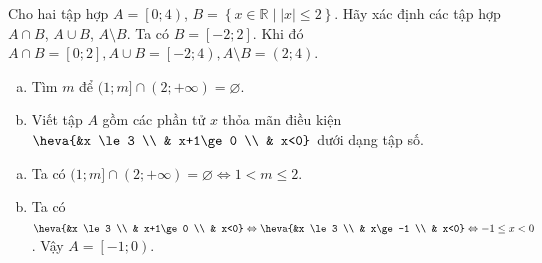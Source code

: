 \begin{bt}%
	Cho hai tập hợp $A=\left[0;4 \right)$, $B=\left \{ x\in \mathbb{R} \mid \left| x \right|\le 2 \right\}$. Hãy xác định các tập hợp $A \cap B$, $A \cup B$, $A \setminus B$.
	\loigiai
	{ Ta có $B=\left[-2;2 \right]$. Khi đó $A \cap B = \left[0;2 \right], A \cup B = \left[-2;4 \right), A \setminus B = \left(2;4 \right).$
	}
\end{bt}

\begin{bt}%
	\begin{enumerate} [a)]
		\item  Tìm $m$ để $(1;m]\cap (2;+\infty )=\varnothing .$
		\item Viết tập $A$ gồm các phần tử $x$ thỏa mãn điều kiện 
		$\heva{&x \le 3 \\ & x+1\ge 0 \\ & x<0}$ dưới dạng tập số.
	\end{enumerate}
	\loigiai
	{\begin{enumerate} [a)]
			\item Ta có $(1;m]\cap (2;+\infty )=\varnothing \Leftrightarrow 1< m \le 2 .$
			\item Ta có  
			$\heva{&x \le 3 \\ & x+1\ge 0 \\ & x<0} \Leftrightarrow \heva{&x \le 3 \\ & x\ge -1 \\ & x<0} \Leftrightarrow -1 \le x <0$. Vậy $A = \left[ -1; 0 \right)$. 
		\end{enumerate}
	}
\end{bt}


